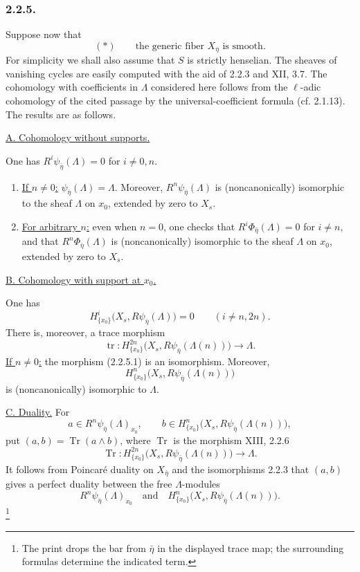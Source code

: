 \subsubsection*{2.2.5.}
Suppose now that
\[
(*)\qquad\text{the generic fiber $X_\eta$ is smooth.}
\]
For simplicity we shall also assume that $S$ is strictly henselian.
The sheaves of vanishing cycles are easily computed with the aid of
2.2.3 and XII, 3.7.  The cohomology with coefficients in $\Lambda$
considered here follows from the $\ell$-adic cohomology of the cited
passage by the universal-coefficient formula (cf. 2.1.13).  The
results are as follows.

\medskip
\noindent\underline{A. Cohomology without supports.}

One has $R^i\psi_{\bar\eta}(\Lambda)=0$ for $i\ne0,n$.

\begin{enumerate}
\item[1)] \underline{If $n\ne0$:}
$\psi_{\bar\eta}(\Lambda)=\Lambda$.  Moreover,
$R^n\psi_{\bar\eta}(\Lambda)$ is (noncanonically) isomorphic to the
sheaf $\Lambda$ on $x_0$, extended by zero to $X_s$.

\item[2)] \underline{For arbitrary $n$:}
even when $n=0$, one checks that
$R^i\Phi_{\bar\eta}(\Lambda)=0$ for $i\ne n$, and that
$R^n\Phi_{\bar\eta}(\Lambda)$ is (noncanonically) isomorphic to the
sheaf $\Lambda$ on $x_0$, extended by zero to $X_s$.
\end{enumerate}

\medskip
\noindent\underline{B. Cohomology with support at $x_0$.}

One has
\[
H^i_{\{x_0\}}\bigl(X_s,R\psi_{\bar\eta}(\Lambda)\bigr)=0
\qquad(i\ne n,2n).
\]
There is, moreover, a trace morphism
\begin{equation}\tag{2.2.5.1}
\operatorname{tr}:
H^{2n}_{\{x_0\}}\bigl(X_s,R\psi_{\bar\eta}(\Lambda(n))\bigr)
\longrightarrow\Lambda.
\end{equation}
\underline{If $n\ne0$:} the morphism (2.2.5.1) is an isomorphism.
Moreover,
\[
H^n_{\{x_0\}}\bigl(X_s,R\psi_{\bar\eta}(\Lambda(n))\bigr)
\]
is (noncanonically) isomorphic to $\Lambda$.

\medskip
\noindent\underline{C. Duality.}
For
\[
a\in R^n\psi_{\bar\eta}(\Lambda)_{x_0},
\qquad
b\in H^n_{\{x_0\}}\bigl(X_s,R\psi_{\bar\eta}(\Lambda(n))\bigr),
\]
put $(a,b)=\operatorname{Tr}(a\wedge b)$, where $\operatorname{Tr}$
is the morphism XIII, 2.2.6
\[
\operatorname{Tr}:
H^{2n}_{\{x_0\}}\bigl(X_s,R\psi_{\bar\eta}(\Lambda(n))\bigr)
\longrightarrow\Lambda.
\]
It follows from Poincar\'e duality on $X_{\bar\eta}$ and the
isomorphisms 2.2.3 that $(a,b)$ gives a perfect duality between the
free $\Lambda$-modules
\[
R^n\psi_{\bar\eta}(\Lambda)_{x_0}
\quad\text{and}\quad
H^n_{\{x_0\}}\bigl(X_s,R\psi_{\bar\eta}(\Lambda(n))\bigr).
\]
\footnote{The print drops the bar from $\bar\eta$ in the displayed
trace map; the surrounding formulas determine the indicated term.}
